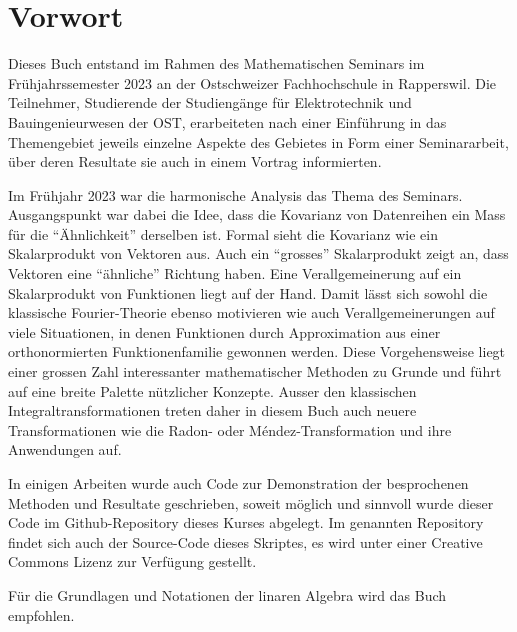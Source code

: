 %
%
%
\chapter*{Vorwort}

Dieses Buch entstand im Rahmen des Mathematischen Seminars
im Frühjahrssemester 2023 an der Ostschweizer Fachhochschule in Rapperswil.
Die Teilnehmer, Studierende der Studiengänge für Elektrotechnik
und Bauingenieurwesen
der OST, erarbeiteten nach einer Einführung in das Themengebiet jeweils
einzelne Aspekte des Gebietes in Form einer Seminararbeit, über
deren Resultate sie auch in einem Vortrag informierten. 

Im Frühjahr 2023 war die harmonische Analysis das Thema des Seminars.
Ausgangspunkt war dabei die Idee, dass die Kovarianz von Datenreihen
ein Mass für die ``Ähnlichkeit'' derselben ist.
Formal sieht die Kovarianz wie ein Skalarprodukt von Vektoren aus.
Auch ein ``grosses'' Skalarprodukt zeigt an, dass Vektoren eine
``ähnliche'' Richtung haben.
Eine Verallgemeinerung auf ein Skalarprodukt von Funktionen liegt auf der Hand.
Damit lässt sich sowohl die klassische Fourier-Theorie ebenso motivieren
wie auch Verallgemeinerungen auf viele Situationen, in denen Funktionen
durch Approximation aus einer orthonormierten Funktionenfamilie gewonnen
werden.
Diese Vorgehensweise liegt einer grossen Zahl interessanter mathematischer
Methoden zu Grunde und führt auf eine breite Palette nützlicher
Konzepte.
Ausser den klassischen Integraltransformationen treten daher in diesem
Buch auch neuere Transformationen wie die Radon- oder M\'endez-Transformation
und ihre Anwendungen auf.

In einigen Arbeiten wurde auch Code zur Demonstration der 
besprochenen Methoden und Resultate geschrieben, soweit
möglich und sinnvoll wurde dieser Code im Github-Repository
%
dieses Kurses%
\cite{buch:repo}
abgelegt.
Im genannten Repository findet sich auch der Source-Code dieses
Skriptes, es wird unter einer Creative Commons Lizenz
zur Verfügung gestellt.

Für die Grundlagen und Notationen der linaren Algebra wird das
Buch \cite{buch:linalg} empfohlen.


